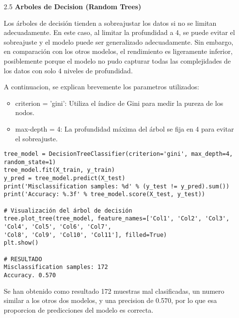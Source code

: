 \documentclass{article}
\begin{document}
\bigskip

\begin{itemize}

\item[2.5]  {\bf Arboles de Decision (Random Trees)}

Los árboles de decisión tienden a sobreajustar los datos si no se limitan adecuadamente. En este caso, al limitar la profundidad a 4, se puede evitar el sobreajuste y el modelo puede ser generalizado adecuadamente. Sin embargo, en comparación con los otros modelos, el rendimiento es ligeramente inferior, posiblemente porque el modelo no pudo capturar todas las complejidades de los datos con solo 4 niveles de profundidad.

A continuacion, se explican brevemente los parametros utilizados:

\begin{itemize}

\item
criterion = 'gini': Utiliza el índice de Gini para medir la pureza de los nodos.

\item
max-depth = 4: La profundidad máxima del árbol se fija en 4 para evitar el sobreajuste.

\end{itemize}

\begin{tcolorbox}[width=14cm]
\begin{scriptsize}
\begin{verbatim}
tree_model = DecisionTreeClassifier(criterion='gini', max_depth=4, random_state=1)
tree_model.fit(X_train, y_train)
y_pred = tree_model.predict(X_test)
print('Misclassification samples: %d' % (y_test != y_pred).sum())
print('Accuracy: %.3f' % tree_model.score(X_test, y_test))

# Visualización del árbol de decisión
tree.plot_tree(tree_model, feature_names=['Col1', 'Col2', 'Col3', 'Col4', 'Col5', 'Col6', 'Col7', 
'Col8', 'Col9', 'Col10', 'Col11'], filled=True)
plt.show()

# RESULTADO
Misclassification samples: 172
Accuracy. 0.570
\end{verbatim}
\end{scriptsize}
\end{tcolorbox}

Se han obtenido como resultado 172 muestras mal clasificadas, un numero similar a los otros dos modelos, y una precision de 0.570, por lo que esa proporcion de predicciones del modelo es correcta.

\end{itemize}
\end{document}
